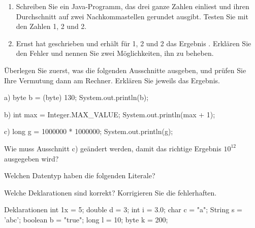 \begin{enumerate}[label=\alph*)]
\item Schreiben Sie ein Java-Programm, das drei ganze Zahlen einliest und ihren Durchschnitt auf zwei Nachkommastellen gerundet ausgibt. Testen Sie mit den Zahlen 1, 2 und 2.
\item Ernst hat  geschrieben und erhält für 1, 2 und 2 das Ergebnis . Erklären Sie den Fehler und nennen Sie zwei Möglichkeiten, ihn zu beheben.
\end{enumerate}

Überlegen Sie zuerst, was die folgenden Ausschnitte ausgeben, und prüfen Sie Ihre Vermutung dann am Rechner. Erklären Sie jeweils das Ergebnis.
\begin{tcbraster}[raster columns=3, raster equal height=rows, raster column skip=3mm]
\begin{javacode}[Ausschnitt]{a)}
byte b = (byte) 130;
System.out.println(b);
\end{javacode}
\begin{javacode}[Ausschnitt]{b)}
int max = Integer.MAX_VALUE;
System.out.println(max + 1);
\end{javacode}
\begin{javacode}[Ausschnitt]{c)}
long g = 1000000 * 1000000;
System.out.println(g);
\end{javacode}
\end{tcbraster}
Wie muss Ausschnitt c) geändert werden, damit das richtige Ergebnis $10^{12}$ ausgegeben wird?

\ueben
{}
Welchen Datentyp haben die folgenden Literale? \\[1mm]
 \quad {} \quad {} \quad {} \quad {} \quad {} \quad {} \quad {} \quad {}

Welche Deklarationen sind korrekt? Korrigieren Sie die fehlerhaften.
\begin{javacode}[Ausschnitt]{Deklarationen}
int 1x = 5;
double d = 3;
int i = 3.0;
char c = "a";
String s = 'abc';
boolean b = "true";
long l = 10;
byte k = 200;
\end{javacode}

